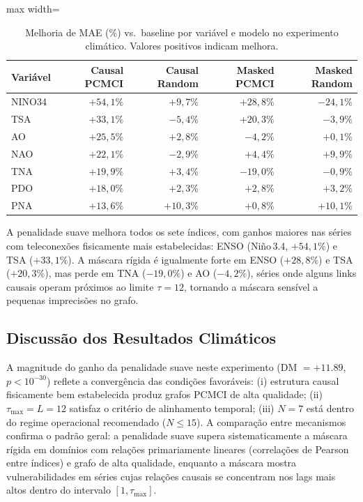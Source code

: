 \documentclass[12pt, a4paper]{article}
\begin{document}
\begin{table}[H]
\centering
\caption{Melhoria de MAE (\%) vs.\ baseline por variável e modelo no experimento climático. Valores positivos indicam melhora.}
\label{tab:climate_pervar}
\small
\begin{adjustbox}{max width=\textwidth}
\begin{tabular}{lrrrr}
\toprule
Variável & Causal PCMCI & Causal Random & Masked PCMCI & Masked Random \\
\midrule
NINO34 & $+54{,}1\%$ & $+9{,}7\%$  & $+28{,}8\%$ & $-24{,}1\%$ \\
TSA    & $+33{,}1\%$ & $-5{,}4\%$  & $+20{,}3\%$ & $-3{,}9\%$  \\
AO     & $+25{,}5\%$ & $+2{,}8\%$  & $-4{,}2\%$  & $+0{,}1\%$  \\
NAO    & $+22{,}1\%$ & $-2{,}9\%$  & $+4{,}4\%$  & $+9{,}9\%$  \\
TNA    & $+19{,}9\%$ & $+3{,}4\%$  & $-19{,}0\%$ & $-0{,}9\%$  \\
PDO    & $+18{,}0\%$ & $+2{,}3\%$  & $+2{,}8\%$  & $+3{,}2\%$  \\
PNA    & $+13{,}6\%$ & $+10{,}3\%$ & $+0{,}8\%$  & $+10{,}1\%$ \\
\bottomrule
\end{tabular}
\end{adjustbox}
\end{table}

A penalidade suave melhora todos os sete índices, com ganhos maiores nas séries com teleconexões fisicamente mais estabelecidas: ENSO (Niño\,3.4, $+54{,}1\%$) e TSA ($+33{,}1\%$). A máscara rígida é igualmente forte em ENSO ($+28{,}8\%$) e TSA ($+20{,}3\%$), mas perde em TNA ($-19{,}0\%$) e AO ($-4{,}2\%$), séries onde alguns links causais operam próximos ao limite $\tau = 12$, tornando a máscara sensível a pequenas imprecisões no grafo.

\subsection{Discussão dos Resultados Climáticos}

A magnitude do ganho da penalidade suave neste experimento (DM $= +11.89$, $p < 10^{-30}$) reflete a convergência das condições favoráveis: (i) estrutura causal fisicamente bem estabelecida produz grafos PCMCI de alta qualidade; (ii) $\tau_{\max} = L = 12$ satisfaz o critério de alinhamento temporal; (iii) $N = 7$ está dentro do regime operacional recomendado ($N \leq 15$). A comparação entre mecanismos confirma o padrão geral: a penalidade suave supera sistematicamente a máscara rígida em domínios com relações primariamente lineares (correlações de Pearson entre índices) e grafo de alta qualidade, enquanto a máscara mostra vulnerabilidades em séries cujas relações causais se concentram nos lags mais altos dentro do intervalo $[1, \tau_{\max}]$.
\end{document}
